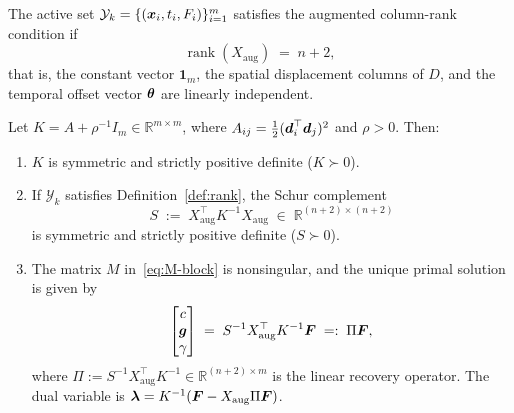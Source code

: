 \begin{definition}
\label{def:rank}
The active set $\mathcal{Y}_k = \{(\boldsymbol{x}_i, t_i, F_i)\}_{i=1}^m$ satisfies the augmented column-rank condition if
\begin{equation}\label{eq:full-rank}
  \operatorname{rank}(X_{\mathrm{aug}}) \;=\; n + 2,
\end{equation}
that is, the constant vector $\mathbf{1}_m$, the spatial displacement columns of $D$, and the temporal offset vector $\boldsymbol{\theta}$ are linearly independent.
\end{definition}

\begin{proposition}
\label{prop:solvability}
Let $K = A + \rho^{-1} I_m \in \mathbb{R}^{m\times m}$, where $A_{ij} = \tfrac{1}{2}(\boldsymbol{d}_i^\top \boldsymbol{d}_j)^2$ and $\rho > 0$. Then:
\begin{enumerate}[\rm(i)]
  \item $K$ is symmetric and strictly positive definite ($K \succ 0$).
  \item If $\mathcal{Y}_k$ satisfies Definition~\ref{def:rank}, the Schur complement
  \begin{equation}\label{eq:schur-S}
    S \;:=\; X_{\mathrm{aug}}^\top K^{-1} X_{\mathrm{aug}} \;\in\; \mathbb{R}^{(n+2)\times(n+2)}
  \end{equation}
  is symmetric and strictly positive definite ($S \succ 0$).
  \item The matrix $M$ in~\eqref{eq:M-block} is nonsingular, and the unique primal solution is given by
  \begin{equation}\label{eq:primal-sol}
    \begin{bmatrix}c\\\boldsymbol{g}\\\gamma\end{bmatrix}
    \;=\;
    S^{-1} X_{\mathrm{aug}}^\top K^{-1} \boldsymbol{F}
    \;=:\;
    \Pi \boldsymbol{F},
  \end{equation}
  where $\Pi := S^{-1} X_{\mathrm{aug}}^\top K^{-1} \in \mathbb{R}^{(n+2)\times m}$ is the linear recovery operator. The dual variable is $\boldsymbol{\lambda} = K^{-1}(\boldsymbol{F} - X_{\mathrm{aug}} \Pi \boldsymbol{F})$.
\end{enumerate}
\end{proposition}

